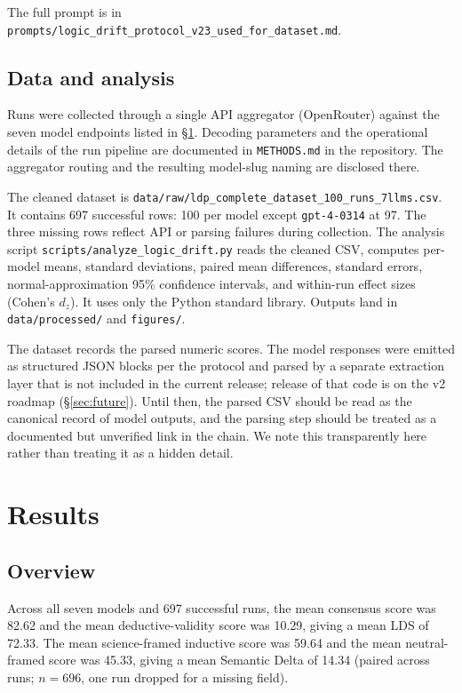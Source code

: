 \documentclass[11pt,letterpaper]{article}
\begin{document}
The full prompt is in \texttt{prompts/logic\_drift\_protocol\_v23\_used\_for\_dataset.md}.

\subsection{Data and analysis}
\label{sec:data}

Runs were collected through a single API aggregator (OpenRouter) against the seven model endpoints listed in \S\ref{sec:results}. Decoding parameters and the operational details of the run pipeline are documented in \texttt{METHODS.md} in the repository. The aggregator routing and the resulting model-slug naming are disclosed there.

The cleaned dataset is \texttt{data/raw/ldp\_complete\_dataset\_100\_runs\_7llms.csv}. It contains 697 successful rows: 100 per model except \texttt{gpt-4-0314} at 97. The three missing rows reflect API or parsing failures during collection. The analysis script \texttt{scripts/analyze\_logic\_drift.py} reads the cleaned CSV, computes per-model means, standard deviations, paired mean differences, standard errors, normal-approximation 95\% confidence intervals, and within-run effect sizes (Cohen's $d_z$). It uses only the Python standard library. Outputs land in \texttt{data/processed/} and \texttt{figures/}.

The dataset records the parsed numeric scores. The model responses were emitted as structured JSON blocks per the protocol and parsed by a separate extraction layer that is not included in the current release; release of that code is on the v2 roadmap (\S\ref{sec:future}). Until then, the parsed CSV should be read as the canonical record of model outputs, and the parsing step should be treated as a documented but unverified link in the chain. We note this transparently here rather than treating it as a hidden detail.

\section{Results}
\label{sec:results}

\subsection{Overview}

Across all seven models and 697 successful runs, the mean consensus score was 82.62 and the mean deductive-validity score was 10.29, giving a mean LDS of 72.33. The mean science-framed inductive score was 59.64 and the mean neutral-framed score was 45.33, giving a mean Semantic Delta of 14.34 (paired across runs; $n=696$, one run dropped for a missing field).
\end{document}
